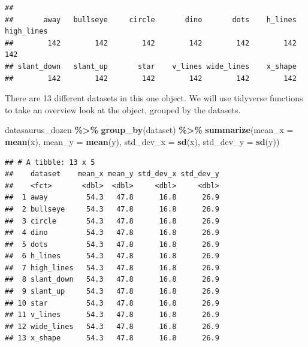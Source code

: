 \documentclass[
]{book}
\newenvironment{Shaded}{\begin{snugshade}}{\end{snugshade}}
\newcommand{\AttributeTok}[1]{\textcolor[rgb]{0.13,0.29,0.53}{#1}}
\newcommand{\FunctionTok}[1]{\textcolor[rgb]{0.13,0.29,0.53}{\textbf{#1}}}
\newcommand{\NormalTok}[1]{#1}
\newcommand{\SpecialCharTok}[1]{\textcolor[rgb]{0.81,0.36,0.00}{\textbf{#1}}}
\begin{document}
\begin{Shaded}
\end{Shaded}

\begin{verbatim}
## 
##       away   bullseye     circle       dino       dots    h_lines high_lines 
##        142        142        142        142        142        142        142 
## slant_down   slant_up       star    v_lines wide_lines    x_shape 
##        142        142        142        142        142        142
\end{verbatim}

There are 13 different datasets in this one object. We will use tidyverse functions to take an overview look at the object, grouped by the datasets.

\begin{Shaded}
\begin{Highlighting}[]
\NormalTok{datasaurus\_dozen }\SpecialCharTok{\%\textgreater{}\%} 
  \FunctionTok{group\_by}\NormalTok{(dataset) }\SpecialCharTok{\%\textgreater{}\%} 
  \FunctionTok{summarize}\NormalTok{(}\AttributeTok{mean\_x =} \FunctionTok{mean}\NormalTok{(x), }
            \AttributeTok{mean\_y =} \FunctionTok{mean}\NormalTok{(y), }
            \AttributeTok{std\_dev\_x =} \FunctionTok{sd}\NormalTok{(x), }
            \AttributeTok{std\_dev\_y =} \FunctionTok{sd}\NormalTok{(y))}
\end{Highlighting}
\end{Shaded}

\begin{verbatim}
## # A tibble: 13 x 5
##    dataset    mean_x mean_y std_dev_x std_dev_y
##    <fct>       <dbl>  <dbl>     <dbl>     <dbl>
##  1 away         54.3   47.8      16.8      26.9
##  2 bullseye     54.3   47.8      16.8      26.9
##  3 circle       54.3   47.8      16.8      26.9
##  4 dino         54.3   47.8      16.8      26.9
##  5 dots         54.3   47.8      16.8      26.9
##  6 h_lines      54.3   47.8      16.8      26.9
##  7 high_lines   54.3   47.8      16.8      26.9
##  8 slant_down   54.3   47.8      16.8      26.9
##  9 slant_up     54.3   47.8      16.8      26.9
## 10 star         54.3   47.8      16.8      26.9
## 11 v_lines      54.3   47.8      16.8      26.9
## 12 wide_lines   54.3   47.8      16.8      26.9
## 13 x_shape      54.3   47.8      16.8      26.9
\end{verbatim}
\end{document}
